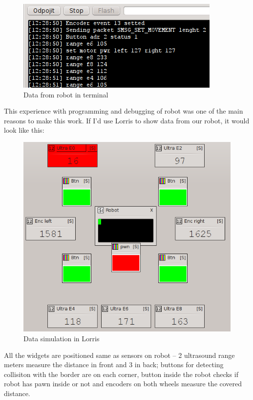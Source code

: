 \documentclass[12pt, a4paper, oneside]{article}
\begin{document}
\begin{figure}[H]
\begin{center}
\includegraphics{img/use_david1.png}
\caption{Data from robot in terminal}
\end{center}
\end{figure}

This experience with programming and debugging of robot was one of the main reasons to make this work. If I'd use Lorris to show data from our robot, it would look like this:
\begin{figure}[H]
\begin{center}
\includegraphics{img/use_david2.png}
\caption{Data simulation in Lorris}
\end{center}
\end{figure}

All the widgets are positioned same as sensors on robot -- 2 ultrasound range meters measure the distance in front and 3 in back; buttons for detecting collisiton with the border are on each corner, button inside the robot checks if robot has pawn inside or not and encoders on both wheels measure the covered distance.
\end{document}
